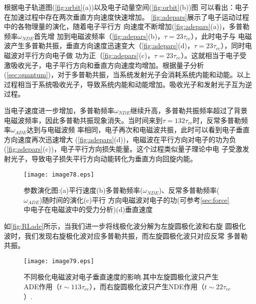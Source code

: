 根据电子轨道图(\autoref{fig:orbit}(a))以及电子动量空间(\autoref{fig:orbit}(b))图
可以看出：电子在加速过程中存在两次垂直方向速度快速增加。
\autoref{fig:adepars}展示了电子运动过程中的各物理量的演化，随着电子平行方
向速度不断增加(\autoref{fig:adepars}(a))，多普勒频率$\omega_{NDE}$首先增
加到电磁波频率（\autoref{fig:adepars}(b)，$τ=23τ_{ce}$），此时电子与
电磁波产生多普勒共振，垂直方向速度迅速变大（\autoref{fig:adepars}(d)，$τ=23τ_{ce}$），同时电磁波对平行方向电子做
功为正（\autoref{fig:adepars}(c)，$τ=23τ_{ce}$）。这就相当于电子受激吸收光子，电子平行方向和垂直方向速度均增加。根据量子分析(\autoref{sec:quantum})，对于多普勒共振，当系统发射光子会消耗系统内能和动能。以上过程相当于系统吸收光子，导致系统内能和动能增加。吸收光子和发射光子互为逆过程。
\par 当电子速度进一步增加，多普勒频率$\omega_{NDE}
$继续升高，多普勒共振频率超过了背景电磁波频率，因此多普勒共振现象消失。当时间来到$τ=132τ_{ce}$时，反常多普勒频率$\omega_{ADE}$达到与电磁波频
率相同，电子再次和电磁波共振，此时可以看到电子垂直方向速度再次迅速增大
(\autoref{fig:adepars}(d))，电磁波在平行方向对电子的功为负
(\autoref{fig:adepars}(c))，电子平行方向损失能量。这个过程类似量子理论中电
子受激发射光子，导致电子损失平行方向动能转化为垂直方向回旋内能。
\begin{figure}
\centering
\texttt{[image: image78.eps]}
\caption{\label{fig:adepars}参数演化图:(a)平行速度(b)多普勒频率($
\omega_{NDE}$)、反常多普勒频率($\omega_{ADE}$)随时间的演化(c)平行
方向电磁波对电子的功(可参考\autoref{sec:force}中电子在电磁波中的受力分析)(d)垂直速度
}
%

\end{figure}
如\autoref{fig:RLade}所示，当我们进一步将线极化波分解为左旋圆极化波和右旋
圆极化波时，我们发现右旋极化波对应多普勒共振，而左旋圆极化波只对应反常
多普勒共振。

\begin{figure}
\centering
\texttt{[image: image79.eps]}
\caption{\label{fig:RLade}不同极化电磁波对电子垂直速度的影响.其中左旋圆极化波只产生ADE作用（$t\sim113\tau_{ee}$），而右旋圆极化波只产生NDE作用（$t\sim22\tau_{ee}$）.
}
\end{figure}

